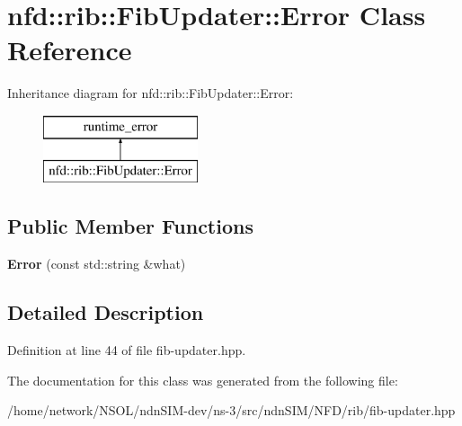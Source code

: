 \hypertarget{classnfd_1_1rib_1_1FibUpdater_1_1Error}{}\section{nfd\+:\+:rib\+:\+:Fib\+Updater\+:\+:Error Class Reference}
\label{classnfd_1_1rib_1_1FibUpdater_1_1Error}
Inheritance diagram for nfd\+:\+:rib\+:\+:Fib\+Updater\+:\+:Error\+:\begin{figure}[H]
\begin{center}
\leavevmode
\includegraphics[height=2.000000cm]{classnfd_1_1rib_1_1FibUpdater_1_1Error}
\end{center}
\end{figure}
\subsection*{Public Member Functions}
\begin{DoxyCompactItemize}
\item 
{\bfseries Error} (const std\+::string \&what)\hypertarget{classnfd_1_1rib_1_1FibUpdater_1_1Error_aa60f6db873a7037950f19be8436a4b82}{}\label{classnfd_1_1rib_1_1FibUpdater_1_1Error_aa60f6db873a7037950f19be8436a4b82}

\end{DoxyCompactItemize}


\subsection{Detailed Description}


Definition at line 44 of file fib-\/updater.\+hpp.



The documentation for this class was generated from the following file\+:\begin{DoxyCompactItemize}
\item 
/home/network/\+N\+S\+O\+L/ndn\+S\+I\+M-\/dev/ns-\/3/src/ndn\+S\+I\+M/\+N\+F\+D/rib/fib-\/updater.\+hpp\end{DoxyCompactItemize}
